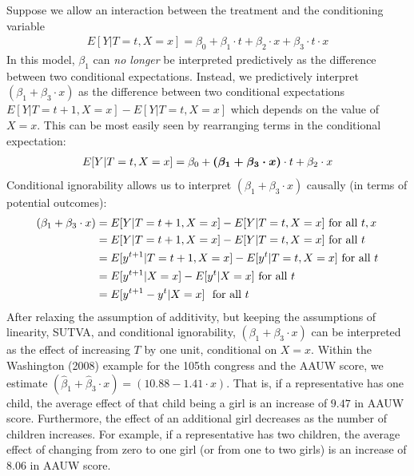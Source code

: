 \documentclass{article}
\begin{document}
Suppose we allow an interaction between the treatment and the conditioning variable
\begin{align*}
E[Y|T=t,X=x] = \beta_0 + \beta_1 \cdot t + \beta_2 \cdot x+ \beta_3 \cdot t \cdot x
\end{align*}
In this model, $\beta_1$ can \emph{no longer} be interpreted predictively as the difference between two conditional expectations. Instead, we predictively interpret $(\beta_1 + \beta_3 \cdot x)$ as the difference between two conditional expectations $E[Y|T=t+1,X=x]-E[Y|T=t,X=x]$ which depends on the value of $X=x$. This can be most easily seen by rearranging terms in the conditional expectation:
\begin{align*}
E[Y|T=t,X=x] = \beta_0 + \boldsymbol{(\beta_1 + \beta_3 \cdot x)} \cdot t + \beta_2 \cdot x
\end{align*}
Conditional ignorability allows us to interpret $(\beta_1 + \beta_3 \cdot x)$ causally (in terms of potential outcomes): 
\begin{align}
(\beta_1 + \beta_3 \cdot x) &= E[Y|T=t+1,X=x]-E[Y|T=t,X=x] \text{ for all } t,x \notag \\
&= E[Y|T=t+1,X=x]-E[Y|T=t,X=x] \text{ for all } t \notag \\
&= E[y^{t+1}|T=t+1,X=x]-E[y^{t}|T=t,X=x] \text{ for all } t \notag\\
&= E[y^{t+1}|X=x]-E[y^{t}|X=x] \text{ for all } t \notag \\
&= E[y^{t+1}-y^{t}|X=x]\ \text{ for all } t \label{eq:condeff}
\end{align}
After relaxing the assumption of additivity, but keeping the assumptions of linearity, SUTVA, and conditional ignorability, $(\beta_1 + \beta_3 \cdot x)$ can be interpreted as the effect of increasing $T$ by one unit, conditional on $X=x$. Within the Washington (2008) example for the 105th congress and the AAUW score, we estimate $(\widehat{\beta}_1 + \widehat{\beta}_3 \cdot x) = (10.88 - 1.41 \cdot x)$. That is, if a representative has one child, the average effect of that child being a girl is an increase of $9.47$ in AAUW score. Furthermore, the effect of an additional girl decreases as the number of children increases. For example, if a representative has two children, the average effect of changing from zero to one girl (or from one to two girls) is an increase of $8.06$ in AAUW score.
\end{document}
